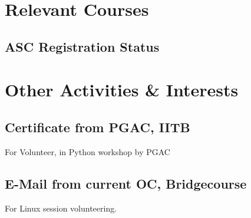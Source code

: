 \documentclass{article}
\begin{document}
\section{Relevant Courses}
	\subsection{ASC Registration Status}
	\begin{figure}[h]
		\end{figure}
\newpage
\section{Other Activities \& Interests}
	\subsection{Certificate from PGAC, IITB}
		For Volunteer, in Python workshop by PGAC
		\begin{figure}[h]
		\end{figure}

\newpage
	\subsection{E-Mail from current OC, Bridgecourse}
		For Linux session volunteering.
		\begin{figure}[h]
		\end{figure}
\end{document}
